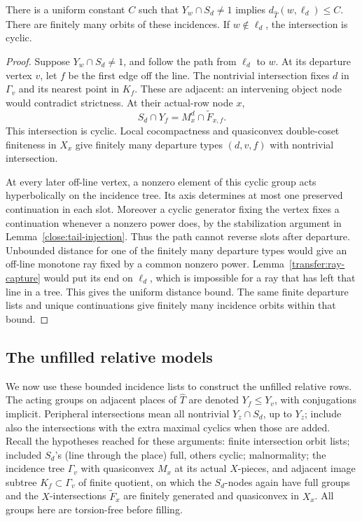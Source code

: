 \begin{lemma}\label{transfer:bounded-incidence}
There is a uniform constant \(C\) such that \(Y_w\cap S_d\ne1\) implies \(d_{\widehat T}(w,\ell_d)\le C\). There are finitely many orbits of these incidences. If \(w\notin\ell_d\), the intersection is cyclic.
\end{lemma}
\begin{proof}
Suppose $Y_w\cap S_d\ne1$, and follow the path from $\ell_d$ to
$w$. At its departure vertex $v$, let $f$ be the first edge off the
line. The nontrivial intersection fixes $d$ in $\Gamma_v$ and its
nearest point in $K_f$. These are adjacent: an intervening object
node would contradict strictness. At their actual-row node $x$,
\[
 S_d\cap Y_f=M_x^d\cap\widetilde F_{x,f}.
\]
This intersection is cyclic. Local cocompactness and quasiconvex
double-coset finiteness in $X_x$ give finitely many departure types
$(d,v,f)$ with nontrivial intersection.

At every later off-line vertex, a nonzero element of this cyclic
group acts hyperbolically on the incidence tree. Its axis determines
at most one preserved continuation in each slot. Moreover a cyclic
generator fixing the vertex fixes a continuation whenever a nonzero
power does, by the stabilization argument in
Lemma~\ref{close:tail-injection}. Thus the path cannot reverse slots
after departure. Unbounded distance for one of the finitely many
departure types would give an off-line monotone ray fixed by a common
nonzero power. Lemma~\ref{transfer:ray-capture} would put its end on
$\ell_d$, which is impossible for a ray that has left that line in
a tree. This gives the uniform distance bound. The same finite
departure lists and unique continuations give finitely many
incidence orbits within that bound.
\end{proof}

\subsection{The unfilled relative models}

We now use these bounded incidence lists to construct the unfilled relative rows. The acting groups on adjacent places of \(\widehat T\) are denoted \(Y_f\le Y_v\), with conjugations implicit. Peripheral intersections mean all nontrivial \(Y_z\cap S_d\), up to \(Y_z\); include also the intersections with the extra maximal cyclics when those are added. Recall the hypotheses reached for these arguments: finite intersection orbit lists; included \(S_d\)'s (line through the place) full, others cyclic; malnormality; the incidence tree \(\Gamma_v\) with quasiconvex \(M_x\) at its actual \(X\)-pieces, and adjacent image subtree \(K_f\subset\Gamma_v\) of finite quotient, on which the \(S_d\)-nodes again have full groups and the \(X\)-intersections \(\widetilde F_x\) are finitely generated and quasiconvex in \(X_x\). All groups here are torsion-free before filling.

